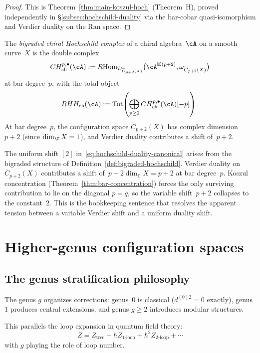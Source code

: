 \begin{proof}
This is Theorem~\ref{thm:main-koszul-hoch} (Theorem~H), proved
independently in \S\ref{subsec:hochschild-duality} via
the bar-cobar quasi-isomorphism and Verdier duality on the Ran space.
\end{proof}

\begin{definition}
\label{def:bigraded-hochschild}
The \emph{bigraded chiral Hochschild complex} of a chiral
algebra~$\cA$ on a smooth curve~$X$ is the double complex
\[
CH^{p,\bullet}_{\mathrm{ch}}(\cA) :=
R\mathrm{Hom}_{\mathcal{D}_{\overline{C}_{p+2}(X)}}
\bigl(\cA^{\boxtimes(p+2)}, \omega_{\overline{C}_{p+2}(X)}\bigr)
\]
at bar degree~$p$, with the total object
\[
RHH_{\mathrm{ch}}(\cA) :=
\operatorname{Tot}\!\left(
\bigoplus_{p \geq 0} CH^{p,\bullet}_{\mathrm{ch}}(\cA)[-p]
\right).
\]
At bar degree~$p$, the configuration space
$\overline{C}_{p+2}(X)$ has complex dimension~$p + 2$
\textup{(}since $\dim_\C X = 1$\textup{)}, and Verdier duality
contributes a shift of~$p+2$.
\end{definition}

\begin{remark}\label{rem:hochschild-shift-origin}
The uniform shift $[2]$ in~\eqref{eq:hochschild-duality-canonical}
arises from the bigraded structure of
Definition~\ref{def:bigraded-hochschild}.
Verdier duality on $\overline{C}_{p+2}(X)$ contributes a shift
of~$p + 2\dim_{\mathbb{C}} X = p + 2$ at bar degree~$p$.
Koszul concentration
(Theorem~\ref{thm:bar-concentration}) forces the only surviving
contribution to lie on the diagonal $p = q$, so the variable
shift~$p+2$ collapses to the constant~$2$.
This is the bookkeeping sentence that resolves the apparent
tension between a variable Verdier shift and a uniform
duality shift.
\end{remark}


\section{Higher-genus configuration spaces}
\label{sec:higher-genus-config-complete}

\subsection{The genus stratification philosophy}

\begin{remark}
\label{princ:genus-quantum}
The genus $g$ organizes corrections: genus~$0$ is classical ($d^{(0)2} = 0$ exactly), genus~$1$ produces central extensions, and genus $g \geq 2$ introduces modular structures.

This parallels the loop expansion in quantum field theory:
\begin{equation}
Z = Z_{\text{tree}} + \hbar Z_{\text{1-loop}} + \hbar^2 Z_{\text{2-loop}} + \cdots
\end{equation}
with $g$ playing the role of loop number.
\end{remark}

